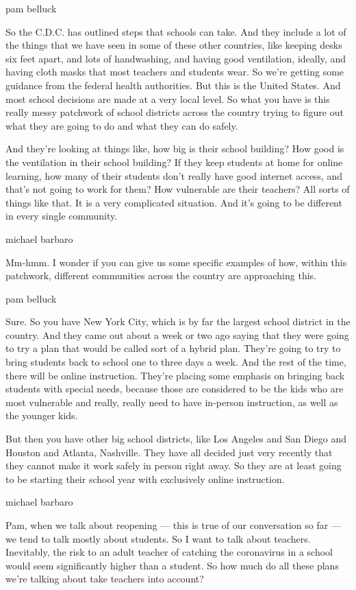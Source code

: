 pam belluck

So the C.D.C. has outlined steps that schools can take. And they include
a lot of the things that we have seen in some of these other countries,
like keeping desks six feet apart, and lots of handwashing, and having
good ventilation, ideally, and having cloth masks that most teachers and
students wear. So we're getting some guidance from the federal health
authorities. But this is the United States. And most school decisions
are made at a very local level. So what you have is this really messy
patchwork of school districts across the country trying to figure out
what they are going to do and what they can do safely.

And they're looking at things like, how big is their school building?
How good is the ventilation in their school building? If they keep
students at home for online learning, how many of their students don't
really have good internet access, and that's not going to work for them?
How vulnerable are their teachers? All sorts of things like that. It is
a very complicated situation. And it's going to be different in every
single community.

michael barbaro

Mm-hmm. I wonder if you can give us some specific examples of how,
within this patchwork, different communities across the country are
approaching this.

pam belluck

Sure. So you have New York City, which is by far the largest school
district in the country. And they came out about a week or two ago
saying that they were going to try a plan that would be called sort of a
hybrid plan. They're going to try to bring students back to school one
to three days a week. And the rest of the time, there will be online
instruction. They're placing some emphasis on bringing back students
with special needs, because those are considered to be the kids who are
most vulnerable and really, really need to have in-person instruction,
as well as the younger kids.

But then you have other big school districts, like Los Angeles and San
Diego and Houston and Atlanta, Nashville. They have all decided just
very recently that they cannot make it work safely in person right away.
So they are at least going to be starting their school year with
exclusively online instruction.

michael barbaro

Pam, when we talk about reopening --- this is true of our conversation
so far --- we tend to talk mostly about students. So I want to talk
about teachers. Inevitably, the risk to an adult teacher of catching the
coronavirus in a school would seem significantly higher than a student.
So how much do all these plans we're talking about take teachers into
account?

